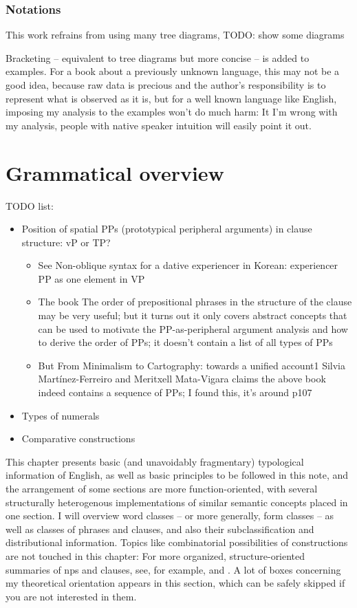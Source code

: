 \documentclass[UTF8, a4paper, oneside, scheme=plain]{ctexrep}
\begin{document}
\subsection{Notations}

This work refrains from using many tree diagrams, TODO: show some diagrams

Bracketing -- equivalent to tree diagrams but more concise -- 
is added to examples.
For a book about a previously unknown language,
this may not be a good idea,
because raw data is precious and 
the author's responsibility is to represent what is observed as it is,
but for a well known language like English,
imposing my analysis to the examples 
won't do much harm:
It I'm wrong with my analysis,
people with native speaker intuition will easily point it out.

\chapter{Grammatical overview}\label{chap:overview}

TODO list:
\begin{itemize}
    \item Position of spatial PPs (prototypical peripheral arguments) in clause structure: vP or TP?
    \begin{itemize}
        \item See Non-oblique syntax for a dative experiencer in Korean: experiencer PP as one element in VP
        \item The book The order of prepositional phrases in the structure of the clause may be very useful;
        but it turns out it only covers abstract concepts that can be used to motivate the PP-as-peripheral argument analysis and how to derive the order of PPs; it doesn't contain a list of all types of PPs
        \item But From Minimalism to Cartography: towards a unified account1
        Silvia Martínez-Ferreiro and Meritxell Mata-Vigara claims the above book indeed contains 
        a sequence of PPs; I found this, it's around p107
    \end{itemize}
    \item Types of numerals 
    \item Comparative constructions
\end{itemize}

This chapter presents basic (and unavoidably fragmentary) typological information of English,
as well as basic principles to be followed in this note,
and the arrangement of some sections are more function-oriented, 
with several structurally heterogenous implementations of 
similar semantic concepts placed in one section.
I will overview word classes -- or more generally, form classes -- 
as well as classes of phrases and clauses,
and also their subclassification and distributional information.
Topics like combinatorial possibilities of constructions
are not touched in this chapter:
For more organized, structure-oriented summaries of 
\acs{np}s and clauses, 
see, for example,  and .
A lot of boxes concerning my theoretical orientation appears in this section,
which can be safely skipped if you are not interested in them.
\end{document}

